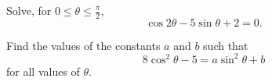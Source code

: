 \begin{questions}

\question[3]
	Solve, for ${0 \leq \theta \leq \frac{\pi}{2},}$
    $$\cos 2 \theta  - 5 \sin \theta  + 2 = 0.$$
\droppoints


\question[3]
	Find the values of the constants ${a}$ and
    ${b}$ such that
    $$8 \cos^2 \theta - 5 = a\sin^2 \theta + b$$
    for all values of ${\theta.}$
\droppoints



\end{questions}

\newpage


